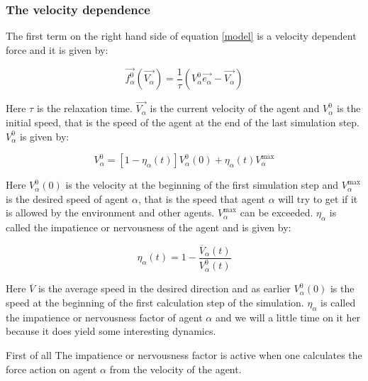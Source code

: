 \subsubsection{The velocity dependence} %
The first term on the right hand side of equation \eqref{model} is a velocity dependent force 
and it is given by:

\begin{equation}
	\vec{f^{0}_{\alpha}}\left( \vec{V_{\alpha}} \right) =
    \frac{1}{\tau}
    \left( V_{\alpha}^{0} \vec{e_{\alpha}} - \vec{V_{\alpha}} \right)
\end{equation}

Here $\tau$ is the relaxation time. %
$\vec{V_{\alpha}}$ is the  current velocity of the agent and $V_{\alpha}^{0}$ 
is the initial speed, that is the speed of the agent at the end of the last 
simulation step. $V_{\alpha}^{0}$ is given by:

\begin{equation}\label{v0}
    V_{\alpha}^{0} = \left[ 1 - \eta_{\alpha} \left( t \right) \right] 
    V_{\alpha}^{0} \left( 0 \right) +
    \eta_{\alpha} \left( t \right)V_{\alpha}^{\text{max}}
\end{equation}

Here $V_{\alpha}^{0} \left( 0 \right)$ is the velocity at the beginning of the 
first simulation step and $V_{\alpha}^{\text{max}}$ is the desired speed of agent
$\alpha$, that is the speed that agent $\alpha$ will try to get if it is allowed by the 
environment and other agents. $V_{\alpha}^{\text{max}}$ can be exceeded. $\eta_{\alpha}$ 
is called the impatience or nervousness of the agent and is given by:

\begin{equation}
	\eta_{\alpha} \left( t \right) =
    1 - \frac{\overline{V}_{\alpha} \left( t \right)}
             {V_{\alpha}^{0} \left( t \right)}
\end{equation}

Here $\overline{V}$ is the average speed in the desired direction and as 
earlier $V_{\alpha}^{0} \left( 0 \right)$ is the speed at the beginning of the 
first calculation step of the simulation. $\eta_{\alpha}$ is called the impatience 
or nervousness factor of agent $\alpha$ and we will a little time on it her because 
it does yield some interesting dynamics. 

First of all The impatience or nervousness factor is active when one calculates the 
force action on agent $\alpha$ from the velocity of the agent.


